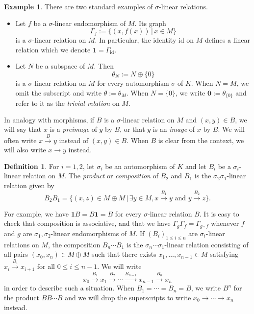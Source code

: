 \documentclass[12pt]{amsart}
\theoremstyle{definition}
\newtheorem{definition}[theorem]{Definition}
\newtheorem{example}[theorem]{Example}
\newcommand{\<}{\langle}   %
\renewcommand{\>}{\rangle} %
\begin{document}
\begin{example} There are two standard examples of $\sigma$-linear relations. 
\begin{itemize}
    \item Let $f$ be a $\sigma$-linear endomorphism of $M$. Its graph 
\begin{equation*}
    \Gamma_f := \{(x,f(x))\,|\, x \in M\}
\end{equation*}
is a $\sigma$-linear relation on $M$. In particular, the identity $\mathrm{id}$ on $M$ defines a linear relation which we denote $\mathbf 1 = \Gamma_{\mathrm{id}}$.
\item Let $N$ be a subspace of $M$. Then
\begin{equation*}
    \theta_N := N \oplus \{0\}
\end{equation*}
is a $\sigma$-linear relation on $M$ for every automorphism $\sigma$ of $K$. When $N = M$, we omit the subscript and write $\theta := \theta_M$. When $N = \{0\}$, we write $\mathbf 0 := \theta_{\{0\}}$ and refer to it as the \textit{trivial relation} on $M$.
\end{itemize}
\end{example}

In analogy with morphisms, if $B$ is a $\sigma$-linear relation on $M$ and $(x,y) \in B$, we will say that $x$ is a \textit{preimage} of $y$ by $B$, or that $y$ is an \textit{image} of $x$ by $B$. We will often write $x \xrightarrow{B} y$ instead of $(x,y) \in B$. When $B$ is clear from the context, we will also write $x \to y$ instead.

\begin{definition}
    For $i=1,2$, let $\sigma_i$ be an automorphism of $K$ and let $B_i$ be a $\sigma_i$-linear relation on $M$. The \textit{product} or \textit{composition} of $B_2$ and $B_1$ is the $\sigma_2\sigma_1$-linear relation given by
    \begin{equation*}
        B_2B_1 = \{(x,z) \in M\oplus M \,|\, \exists y \in M, x\xrightarrow{B_1} y \text{ and } y \xrightarrow{B_2} z\}.
    \end{equation*}
\end{definition}

For example, we have $\mathbf 1 B = B \mathbf 1 = B$ for every $\sigma$-linear relation $B$. It is easy to check that composition is associative, and that we have $\Gamma_g\Gamma_f = \Gamma_{g\circ f}$ whenever $f$ and $g$ are $\sigma_1,\sigma_2$-linear endomorphisms of $M$. If $(B_i)_{1\leq i \leq n}$ are $\sigma_i$-linear relations on $M$, the composition $B_n\cdots B_1$ is the $\sigma_n\cdots\sigma_1$-linear relation consisting of all pairs $(x_0,x_{n}) \in M\oplus M$ such that there exists $x_1,\ldots , x_{n-1} \in M$ satisfying $x_i \xrightarrow{B_i} x_{i+1}$ for all $0\leq i \leq n-1$. We will write 
\begin{equation*}
    x_0 \xrightarrow{B_1} x_1 \xrightarrow{B_2} \cdots \xrightarrow{B_{n-1}} x_{n-1} \xrightarrow{B_n} x_{n}
\end{equation*}
in order to describe such a situation. When $B_1 = \cdots = B_n = B$, we write $B^n$ for the product $BB\cdots B$ and we will drop the superscripts to write $x_0 \to \cdots \to x_{n}$ instead.
\end{document}
